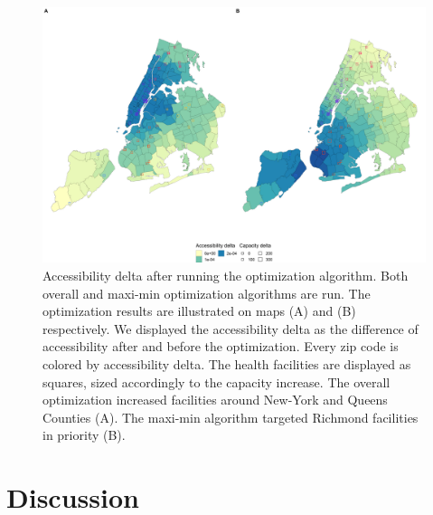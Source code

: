\begin{figure}[h]
    \includegraphics[width=\textwidth]{images/camion-ny/fig3.png}
    \centering
    \caption{
        Accessibility delta after running the optimization algorithm. Both overall and maxi-min optimization algorithms are run. The optimization results are illustrated on maps (A) and (B) respectively. We displayed the accessibility delta as the difference of accessibility after and before the optimization. Every zip code is colored by accessibility delta. The health facilities are displayed as squares, sized accordingly to the capacity increase. The overall optimization increased facilities around New-York and Queens Counties (A). The maxi-min algorithm targeted Richmond facilities in priority (B).
    }
    \label{fig:camion-ny-optim}
\end{figure}

\section{Discussion}

